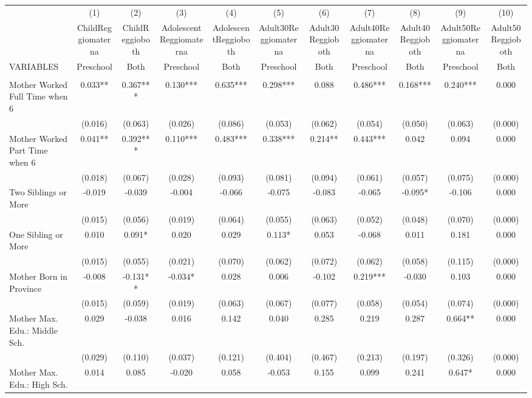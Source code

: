 \begin{tabular}{lcccccccccc} \hline
 & (1) & (2) & (3) & (4) & (5) & (6) & (7) & (8) & (9) & (10) \\
 & ChildReggiomaterna & ChildReggioboth & AdolescentReggiomaterna & AdolescentReggioboth & Adult30Reggiomaterna & Adult30Reggioboth & Adult40Reggiomaterna & Adult40Reggioboth & Adult50Reggiomaterna & Adult50Reggioboth \\
VARIABLES & Preschool & Both & Preschool & Both & Preschool & Both & Preschool & Both & Preschool & Both \\ \hline
 &  &  &  &  &  &  &  &  &  &  \\
Mother Worked Full Time when 6 & 0.033** & 0.367*** & 0.130*** & 0.635*** & 0.298*** & 0.088 & 0.486*** & 0.168*** & 0.240*** & 0.000 \\
 & (0.016) & (0.063) & (0.026) & (0.086) & (0.053) & (0.062) & (0.054) & (0.050) & (0.063) & (0.000) \\
Mother Worked Part Time when 6 & 0.041** & 0.392*** & 0.110*** & 0.483*** & 0.338*** & 0.214** & 0.443*** & 0.042 & 0.094 & 0.000 \\
 & (0.018) & (0.067) & (0.028) & (0.093) & (0.081) & (0.094) & (0.061) & (0.057) & (0.075) & (0.000) \\
Two Siblings or More & -0.019 & -0.039 & -0.004 & -0.066 & -0.075 & -0.083 & -0.065 & -0.095* & -0.106 & 0.000 \\
 & (0.015) & (0.056) & (0.019) & (0.064) & (0.055) & (0.063) & (0.052) & (0.048) & (0.070) & (0.000) \\
One Sibling or More & 0.010 & 0.091* & 0.020 & 0.029 & 0.113* & 0.053 & -0.068 & 0.011 & 0.181 & 0.000 \\
 & (0.015) & (0.055) & (0.021) & (0.070) & (0.062) & (0.072) & (0.062) & (0.058) & (0.115) & (0.000) \\
Mother Born in Province & -0.008 & -0.131** & -0.034* & 0.028 & 0.006 & -0.102 & 0.219*** & -0.030 & 0.103 & 0.000 \\
 & (0.015) & (0.059) & (0.019) & (0.063) & (0.067) & (0.077) & (0.058) & (0.054) & (0.074) & (0.000) \\
Mother Max. Edu.: Middle Sch. & 0.029 & -0.038 & 0.016 & 0.142 & 0.040 & 0.285 & 0.219 & 0.287 & 0.664** & 0.000 \\
 & (0.029) & (0.110) & (0.037) & (0.121) & (0.404) & (0.467) & (0.213) & (0.197) & (0.326) & (0.000) \\
Mother Max. Edu.: High Sch. & 0.014 & 0.085 & -0.020 & 0.058 & -0.053 & 0.155 & 0.099 & 0.241 & 0.647* & 0.000 \\

\end{tabular}
